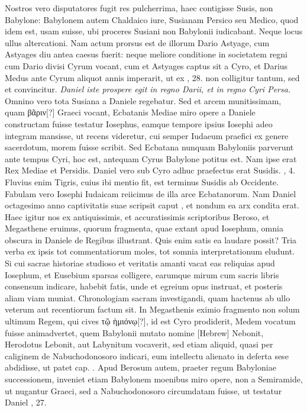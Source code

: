 Nostros vero disputatores fugit res pulcherrima,
 haec contigisse
Susis, non Babylone: Babylonem autem Chaldaico iure, Susianam
Persico seu Medico, quod idem est, usam suisse, ubi proceres Susiani
non Babylonii iudicabant.
Neque locus ullus altercationi.
Nam actum prorsus est de illorum Dario Astyage, cum Astyages diu antea
caesus fuerit: neque meliore conditione in societatem regni cum
Dario divisi Cyrum vocant, cum et Astyages captus sit a Cyro, et
Darius Medus ante Cyrum aliquot annis imperarit, ut ex , 28.
non colligitur tantum, sed et convincitur.
\textit{Daniel iste prospere egit in regno Darii,
 et in regno Cyri Persa.}
Omnino vero tota Susiana a Daniele regebatur.
Sed et arcem munitissimam, quam \textgreek{βᾶριν[?]}
Graeci vocant, Ecbatanis Mediae miro opere a Daniele constructam
fuisse testatur Iosephus, eamque tempore ipsius Iosephi adeo
integram mansisse, ut recens videretur, cui semper Iudaeum praefici
ex genere sacerdotum, morem fuisse scribit.
Sed Ecbatana nunquam
Babyloniis parverunt ante tempus Cyri, hoc est, antequam
Cyrus Babylone potitus est.
Nam ipse erat Rex Mediae et Persidis.
Daniel vero sub Cyro adhuc praefectus erat Susidis. , 4.
Fluvius
enim Tigris, cuius ibi mentio fit, est terminus Susidis ab Occidente.
Fabulam vero Iosephi Iudaicam reiicimus de illa arce Ecbatanorum.
Nam Daniel octagesimo anno captivitatis suae scripsit caput
, et nondum ea arx condita erat.
Haec igitur nos ex antiquissimis,
et accuratissimis scriptoribus Beroso, et Megasthene eruimus, quorum
fragmenta, quae extant apud Iosephum, omnia obscura in Daniele
de Regibus illustrant.
Quis enim satis ea laudare possit?
Tria verba ex ipsis tot commentatiorum moles,
 tot somnia interpretationum
eludunt.
Si cui sacrae historiae studioso et veritatis amanti
vacat eas reliquias apud Iosephum, et Eusebium sparsas colligere,
earumque mirum cum sacris libris consensum indicare, habebit
fatis, unde et egreium opus instruat, et posteris aliam viam
muniat.
Chronologiam sacram investigandi, quam hactenus
ab ullo veterum aut recentiorum factum sit.
In Megasthenis eximio fragmento non solum ultimum Regem, qui cives
 \textgreek{τῷ ἡμιόνῳ[?]}, id
est Cyro prodiderit, Medem vocatum fuisse animadvertet, quem
Babylonii mutato nomine \texthebrew{[Hebrew]} Nebonit, Herodotus Lebonit,
aut Labynitum vocaverit, sed etiam aliquid, quasi per caliginem
de Nabuchodonosoro indicari, eum intellectu alienato in deferta
sese abdidisse, ut patet cap. .
Apud Berosum autem, praeter
regum Babyloniae successionem, inveniet etiam Babylonem moenibus
miro opere, non a Semiramide, ut nugantur Graeci, sed a Nabuchodonosoro
circumdatam fuisse, ut testatur Daniel , 27.

